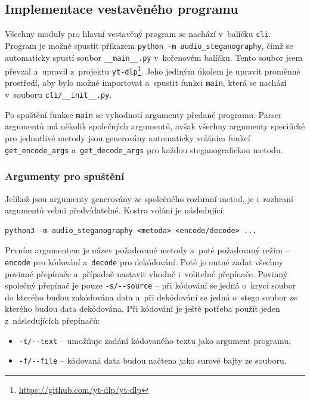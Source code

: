 \subsection*{Implementace vestavěného programu}
\label{sub:tui-implementation}

Všechny moduly pro hlavní vestavěný program se nachází v~balíčku \texttt{cli}.
Program je možné spustit příkazem \texttt{python -m audio\_steganography}, čímž
se automaticky spustí soubor \texttt{\_\_main\_\_.py} v~kořenovém balíčku.
Tento soubor jsem převzal a~upravil z~projektu
\texttt{yt-dlp}\footnote{\url{https://github.com/yt-dlp/yt-dlp}}. Jeho jediným
úkolem je upravit proměnné prostředí, aby bylo možné importovat a~spustit
funkci \texttt{main}, která se nachází v~souboru \texttt{cli/\_\_init\_\_.py}.

Po spuštění funkce \texttt{main} se vyhodnotí argumenty předané programu.
Parser argumentů má několik společných argumentů, avšak všechny argumenty
specifické pro jednotlivé metody jsou generovány automaticky voláním funkcí
\texttt{get\_encode\_args} a~\texttt{get\_decode\_args} pro každou
steganografickou metodu.

\subsubsection*{Argumenty pro spuštění}
\label{ssub:tui-arguments}

Jelikož jsou argumenty generovány ze společného rozhraní metod, je i~rozhraní
argumentů velmi předvídatelné. Kostra volání je následující:

\begin{verbatim}
python3 -m audio_steganography <metoda> <encode/decode> ...
\end{verbatim}

Prvním argumentem je název požadované metody a~poté požadovaný režim --
\texttt{encode} pro kódování a~\texttt{decode} pro dekódování. Poté je nutné
zadat všechny povinné přepínače a~případně nastavit vhodně i~volitelné
přepínače. Povinný společný přepínač je pouze \verb|-s/--source| -- při
kódování se jedná o~krycí soubor do kterého budou zakódována data a~při
dekódování se jedná o~stego soubor ze kterého budou data dekódována. Při
kódování je ještě potřeba použít jeden z~následujících přepínačů:

\begin{itemize}
    \item \verb|-t/--text| -- umožňuje zadání kódovaného textu jako argument
        programu,
    \item \verb|-f/--file| -- kódovaná data budou načtena jako surové bajty ze
        souboru.
\end{itemize}

